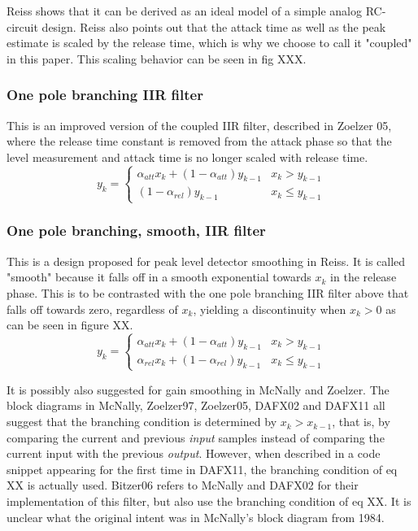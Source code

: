 \documentclass[]{article}
\begin{document}
Reiss shows that it can be derived as an ideal model of a simple analog RC-circuit design. Reiss also points out that the attack time as well as the peak estimate is scaled by the release time, which is why we choose to call it "coupled" in this paper. This scaling behavior can be seen in fig XXX.

\subsubsection{One pole branching IIR filter}
This is an improved version of the coupled IIR filter, described in Zoelzer 05, where the release time constant is removed from the attack phase so that the level measurement and attack time is no longer scaled with release time.
\begin{equation}
y_k = \begin{cases}
    \alpha_{att} x_k + (1-\alpha_{att}) y_{k-1} 	& x_k > y_{k-1} \\
    (1-\alpha_{rel}) y_{k-1} 					& x_k \leq y_{k-1}
\end{cases}
\end{equation}

\subsubsection{One pole branching, smooth, IIR filter}
This is a design proposed for peak level detector smoothing in Reiss. It is called "smooth" because it falls off in a smooth exponential towards $x_k$ in the release phase. This is to be contrasted with the one pole branching IIR filter above that falls off towards zero, regardless of $x_k$, yielding a discontinuity when $x_k > 0$ as can be seen in figure XX.
\begin{equation}
y_k = \begin{cases}
    \alpha_{att} x_k + (1-\alpha_{att}) y_{k-1} 	& x_k > y_{k-1} \\
    \alpha_{rel} x_k + (1-\alpha_{rel}) y_{k-1} 	& x_k \leq y_{k-1}
\end{cases}
\end{equation}

It is possibly also suggested for gain smoothing in McNally and Zoelzer. The block diagrams in McNally, Zoelzer97, Zoelzer05, DAFX02 and DAFX11 all suggest that the branching condition is determined by $x_k > x_{k-1}$, that is, by comparing the current and previous \emph{input} samples instead of comparing the current input with the previous \emph{output}. However, when described in a code snippet appearing for the first time in DAFX11, the branching condition of eq XX is actually used. Bitzer06 refers to McNally and DAFX02 for their implementation of this filter, but also use the branching condition of eq XX. It is unclear what the original intent was in McNally's block diagram from 1984.
\end{document}
